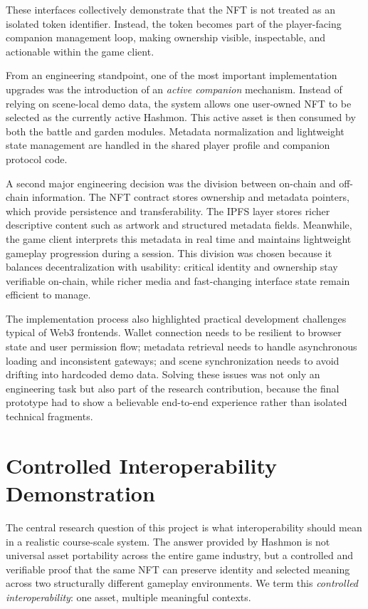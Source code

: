 \documentclass[sigconf]{acmart}
\begin{document}
These interfaces collectively demonstrate that the NFT is not treated as an isolated token identifier. Instead, the token becomes part of the player-facing companion management loop, making ownership visible, inspectable, and actionable within the game client.

From an engineering standpoint, one of the most important implementation upgrades was the introduction of an \emph{active companion} mechanism. Instead of relying on scene-local demo data, the system allows one user-owned NFT to be selected as the currently active Hashmon. This active asset is then consumed by both the battle and garden modules. Metadata normalization and lightweight state management are handled in the shared player profile and companion protocol code.

A second major engineering decision was the division between on-chain and off-chain information. The NFT contract stores ownership and metadata pointers, which provide persistence and transferability. The IPFS layer stores richer descriptive content such as artwork and structured metadata fields. Meanwhile, the game client interprets this metadata in real time and maintains lightweight gameplay progression during a session. This division was chosen because it balances decentralization with usability: critical identity and ownership stay verifiable on-chain, while richer media and fast-changing interface state remain efficient to manage.

The implementation process also highlighted practical development challenges typical of Web3 frontends. Wallet connection needs to be resilient to browser state and user permission flow; metadata retrieval needs to handle asynchronous loading and inconsistent gateways; and scene synchronization needs to avoid drifting into hardcoded demo data. Solving these issues was not only an engineering task but also part of the research contribution, because the final prototype had to show a believable end-to-end experience rather than isolated technical fragments.

\section{Controlled Interoperability Demonstration}
The central research question of this project is what interoperability should mean in a realistic course-scale system. The answer provided by Hashmon is not universal asset portability across the entire game industry, but a controlled and verifiable proof that the same NFT can preserve identity and selected meaning across two structurally different gameplay environments. We term this \emph{controlled interoperability}: one asset, multiple meaningful contexts.
\end{document}

